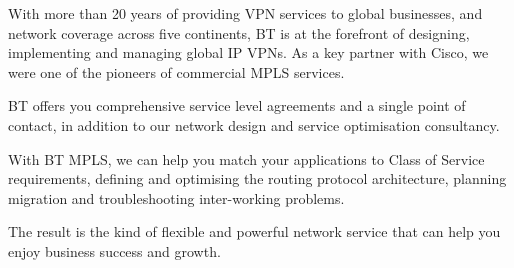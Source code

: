 With more than 20 years of providing VPN services to global businesses, and network coverage across five continents, BT is at the forefront of designing, implementing and managing global IP VPNs. As a key partner with Cisco, we were one of the pioneers of commercial MPLS services.

BT offers you comprehensive service level agreements and a single point of contact, in addition to our network design and service optimisation consultancy.

With BT MPLS, we can help you match your applications to Class of Service requirements, defining and optimising the routing protocol architecture, planning migration and troubleshooting inter-working problems.

The result is the kind of flexible and powerful network service that can help you enjoy business success and growth.


